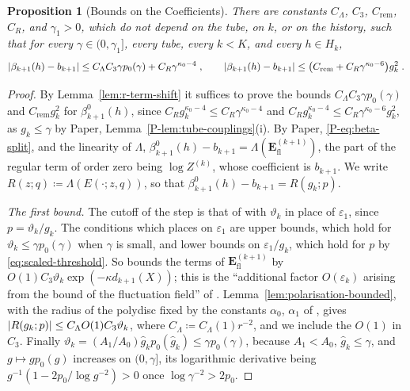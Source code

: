 \documentclass[11pt]{preprint}
\DeclarePairedDelimiter{\abs}{\lvert}{\rvert}
\numberwithin{equation}{section}
\newtheorem{proposition}{Proposition}
\theoremstyle{definition}
\theoremstyle{remark}
\theoremstyle{plain}
\begin{document}
\begin{proposition}[Bounds on the Coefficients]\label{prop:coefficient-bounds}
There are constants $C_\Lambda$, $C_3$, $C_{\mathrm{rem}}$, $C_R$, and $\gamma_1 > 0$, which do not depend on the tube, on $k$, or on the history, such that for every $\gamma \in (0, \gamma_1]$, every tube, every $k < K$, and every $h \in H_k$,
\begin{equation}\label{eq:coefficient-bounds}
    \abs{\beta_{k+1}(h) - b_{k+1}} \leq C_\Lambda C_3\gamma p_0(\gamma) + C_R\gamma^{\kappa_0-4}\;,
    \qquad
    \abs{\beta_{k+1}(h) - b_{k+1}} \leq \bigl(C_{\mathrm{rem}} + C_R\gamma^{\kappa_0-6}\bigr)g_k^2\;.
\end{equation}
\end{proposition}

\begin{proof}
By Lemma~\ref{lem:r-term-shift} it suffices to prove the bounds $C_\Lambda C_3\gamma p_0(\gamma)$ and $C_{\mathrm{rem}}g_k^2$ for $\beta^0_{k+1}(h)$, since $C_Rg_k^{\kappa_0-4} \leq C_R\gamma^{\kappa_0-4}$ and $C_Rg_k^{\kappa_0-4} \leq C_R\gamma^{\kappa_0-6}g_k^2$, as $g_k \leq \gamma$ by Paper, Lemma~\ref{P-lem:tube-couplings}(i). By Paper, \eqref{P-eq:beta-split}, and the linearity of $\Lambda$, $\beta^0_{k+1}(h) - b_{k+1} = \Lambda(\mathbf E^{(k+1)}_{\mathrm{fl}})$, the part of the regular term of order zero being $\log Z^{(k)}$, whose coefficient is $b_{k+1}$. We write $R(z; q) \coloneqq \Lambda(E(\cdot; z, q))$, so that $\beta^0_{k+1}(h) - b_{k+1} = R(g_k; p)$.

\emph{The first bound.} The cutoff of the step is that of \cite[Sect.~2]{BalabanRG2} with $\vartheta_k$ in place of $\varepsilon_1$, since $p = \vartheta_k/g_k$. The conditions which \cite{BalabanRG2} places on $\varepsilon_1$ are upper bounds, which hold for $\vartheta_k \leq \gamma p_0(\gamma)$ when $\gamma$ is small, and lower bounds on $\varepsilon_1/g_k$, which hold for $p$ by \eqref{eq:scaled-threshold}. So \cite[(2.41), p.~21]{BalabanRG2} bounds the terms of $\mathbf E^{(k+1)}_{\mathrm{fl}}$ by $O(1)C_3\vartheta_k\exp(-\kappa d_{k+1}(X))$; this is the ``additional factor $O(\varepsilon_k)$ arising from the bound of the fluctuation field'' of \cite[p.~277]{BalabanCRE}. Lemma~\ref{lem:polarisation-bounded}, with the radius of the polydisc fixed by the constants $\alpha_0$, $\alpha_1$ of \cite[(1.10)--(1.16), p.~262]{BalabanRG1}, gives $\abs{R(g_k; p)} \leq C_\Lambda O(1)C_3\vartheta_k$, where $C_\Lambda \coloneqq C_\Lambda(1)r^{-2}$, and we include the $O(1)$ in $C_3$. Finally $\vartheta_k = (A_1/A_0)\hat g_kp_0(\hat g_k) \leq \gamma p_0(\gamma)$, because $A_1 < A_0$, $\hat g_k \leq \gamma$, and $g \mapsto gp_0(g)$ increases on $(0, \gamma]$, its logarithmic derivative being $g^{-1}(1 - 2p_0/\log g^{-2}) > 0$ once $\log\gamma^{-2} > 2p_0$.


\end{proof}
\end{document}
